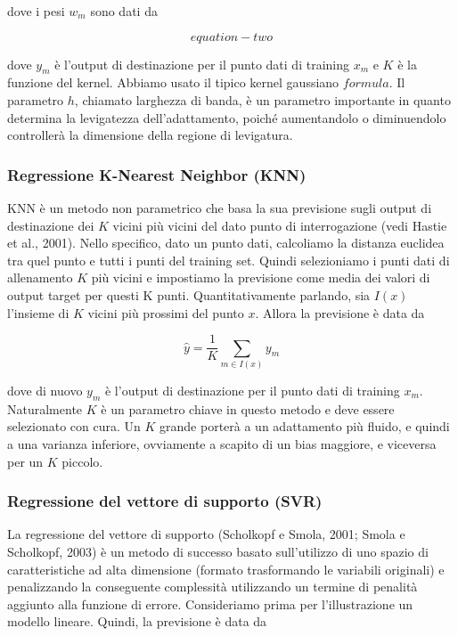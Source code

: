 \documentclass[12pt,a4paper]{report}
\begin{document}
dove i pesi $w_m$ sono dati da

\begin{equation}
equation-two
\end{equation}

dove $y_m$ è l'output di destinazione per il punto dati di training $x_m$ e $K$ è la funzione del kernel. Abbiamo usato il tipico kernel gaussiano $formula$.
Il parametro $h$, chiamato larghezza di banda, è un parametro importante in quanto determina la levigatezza dell'adattamento, poiché aumentandolo o diminuendolo controllerà la dimensione della regione di levigatura.

\subsubsection{Regressione K-Nearest Neighbor (KNN)}
KNN è un metodo non parametrico che basa la sua previsione sugli output di destinazione dei $K$ vicini più vicini del dato punto di interrogazione (vedi Hastie et al., 2001). Nello specifico, dato un punto dati, calcoliamo la distanza euclidea tra quel punto e tutti i punti del training set. Quindi selezioniamo i punti dati di allenamento $K$ più vicini e impostiamo la previsione come media dei valori di output target per questi K punti. Quantitativamente parlando, sia $I(x)$ l'insieme di $K$ vicini più prossimi del punto $x$. Allora la previsione è data da

\begin{equation}
{\displaystyle \hat{y} = \frac{1}{K} \sum\limits_{m \in I(x)} y_m}
\end{equation}

dove di nuovo $y_m$ è l'output di destinazione per il punto dati di training $x_m$.
Naturalmente $K$ è un parametro chiave in questo metodo e deve essere selezionato con cura. Un $K$ grande porterà a un adattamento più fluido, e quindi a una varianza inferiore, ovviamente a scapito di un bias maggiore, e viceversa per un $K$ piccolo.

\subsubsection{Regressione del vettore di supporto (SVR)}
La regressione del vettore di supporto (Scholkopf e Smola, 2001; Smola e Scholkopf, 2003) è un metodo di successo basato sull'utilizzo di uno spazio di caratteristiche ad alta dimensione (formato trasformando le variabili originali) e penalizzando la conseguente complessità utilizzando un termine di penalità aggiunto alla funzione di errore. Consideriamo prima per l'illustrazione un modello lineare. Quindi, la previsione è data da
\end{document}
